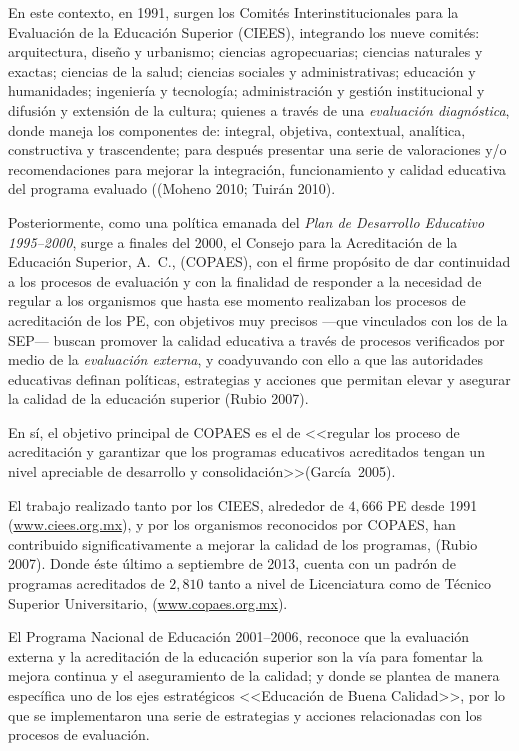  
En este contexto, en 1991, surgen los Comités Interinstitucionales para la
Evaluación de la Educación Superior (CIEES), integrando los nueve comités:
arquitectura, diseño y urbanismo; ciencias agropecuarias; ciencias
naturales y exactas; ciencias de la salud; ciencias sociales y
administrativas; educación y humanidades; ingeniería y tecnología;
administración y gestión institucional y difusión y extensión de la
cultura; quienes a través de una \textit{evaluación diagnóstica}, donde
maneja los componentes de: integral, objetiva, contextual, analítica,
constructiva y trascendente; para después presentar una serie de
valoraciones y\slash{}o recomendaciones para mejorar la integración,
funcionamiento y calidad educativa del programa evaluado ((Moheno 2010;
Tuirán 2010).

 
Posteriormente, como una política emanada del \textit{Plan de Desarrollo
Educativo 1995--2000},  surge a finales del 2000, el Consejo para la
Acreditación de la Educación Superior, A.\ C., (COPAES), con el firme
propósito de dar continuidad a los procesos de evaluación y con la
finalidad de responder a la necesidad de regular a los organismos que hasta
ese momento realizaban  los procesos de acreditación de los PE, con
objetivos muy precisos ---que vinculados con los de la SEP--- buscan promover
la calidad educativa a través de procesos verificados por medio de la
\textit{evaluación externa}, y  coadyuvando con ello a que las autoridades
educativas definan políticas, estrategias y acciones que permitan elevar y
asegurar la calidad de la educación superior (Rubio 2007).

 
En sí, el objetivo principal de  COPAES es el de <<regular los proceso  de
acreditación y garantizar que los programas educativos  acreditados tengan
un nivel apreciable de desarrollo y consolidación>>\linebreak (García~2005). 

\enlargethispage{1\baselineskip} 
El trabajo realizado tanto por los CIEES, alrededor de $4,666$ PE desde 1991
(\url{www.ciees.org.mx}), y por los organismos reconocidos por  COPAES, han
contribuido significativamente a mejorar la calidad de los programas,
(Rubio 2007). Donde éste último a septiembre de 2013, cuenta con un padrón
de programas acreditados de $2,810$ tanto a nivel de Licenciatura como de
Técnico Superior Universitario,
(\href{http://www.copaes.org.mx/}{\url{www.copaes.org.mx}}).
\newpage
 
El Programa Nacional de Educación 2001--2006,  reconoce que la evaluación
externa y la acreditación de la educación superior son la vía para fomentar
 la mejora continua y el aseguramiento de la calidad; y donde se plantea de
manera específica uno de los ejes estratégicos  <<Educación de Buena
Calidad>>,  por lo que se implementaron una serie de estrategias y acciones
relacionadas con los procesos de evaluación.


